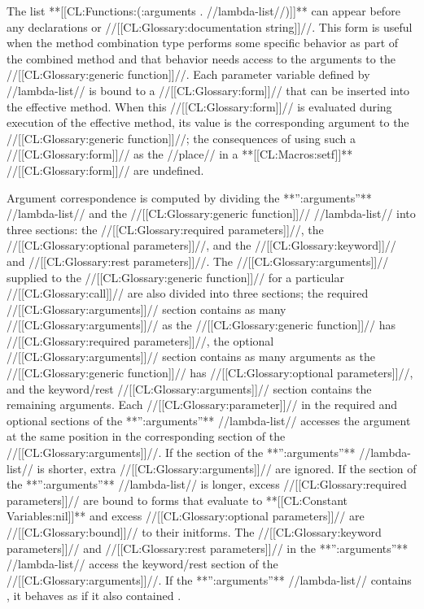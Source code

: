 The list **[[CL:Functions:(:arguments . //lambda-list//)]]** can appear before any declarations or //[[CL:Glossary:documentation string]]//. This form is useful when the method combination type performs some specific behavior as part of the combined method and that behavior needs access to the arguments to the //[[CL:Glossary:generic function]]//. Each parameter variable defined by //lambda-list// is bound to a //[[CL:Glossary:form]]// that can be inserted into the effective method. When this //[[CL:Glossary:form]]// is evaluated during execution of the effective method, its value is the corresponding argument to the //[[CL:Glossary:generic function]]//; the consequences of using such a //[[CL:Glossary:form]]// as the //place// in a **[[CL:Macros:setf]]** //[[CL:Glossary:form]]// are undefined.

Argument correspondence is computed by dividing the **'':arguments''** //lambda-list// and the //[[CL:Glossary:generic function]]// //lambda-list// into three sections: the //[[CL:Glossary:required parameters]]//, the //[[CL:Glossary:optional parameters]]//, and the //[[CL:Glossary:keyword]]// and //[[CL:Glossary:rest parameters]]//. The //[[CL:Glossary:arguments]]// supplied to the //[[CL:Glossary:generic function]]// for a particular //[[CL:Glossary:call]]// are also divided into three sections; the required //[[CL:Glossary:arguments]]// section contains as many //[[CL:Glossary:arguments]]// as the //[[CL:Glossary:generic function]]// has //[[CL:Glossary:required parameters]]//, the optional //[[CL:Glossary:arguments]]// section contains as many arguments as the //[[CL:Glossary:generic function]]// has //[[CL:Glossary:optional parameters]]//, and the keyword/rest //[[CL:Glossary:arguments]]// section contains the remaining arguments. Each //[[CL:Glossary:parameter]]// in the required and optional sections of the **'':arguments''** //lambda-list// accesses the argument at the same position in the corresponding section of the //[[CL:Glossary:arguments]]//. If the section of the **'':arguments''** //lambda-list// is shorter, extra //[[CL:Glossary:arguments]]// are ignored. If the section of the **'':arguments''** //lambda-list// is longer, excess //[[CL:Glossary:required parameters]]// are bound to forms that evaluate to **[[CL:Constant Variables:nil]]** and excess //[[CL:Glossary:optional parameters]]// are //[[CL:Glossary:bound]]// to their initforms. The //[[CL:Glossary:keyword parameters]]// and //[[CL:Glossary:rest parameters]]// in the **'':arguments''** //lambda-list// access the keyword/rest section of the //[[CL:Glossary:arguments]]//. If the **'':arguments''** //lambda-list// contains , it behaves as if it also contained .

